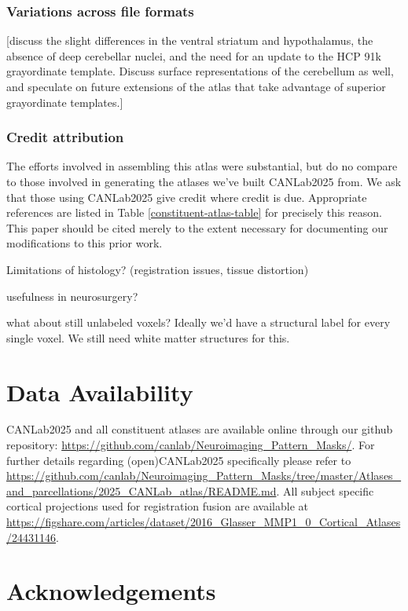 \documentclass[10pt,letterpaper]{article}
\begin{document}
\subsubsection{Variations across file formats}
[discuss the slight differences in the ventral striatum and hypothalamus, the absence of deep cerebellar nuclei, and the need for an update to the HCP 91k grayordinate template. Discuss surface representations of the cerebellum as well, and speculate on future extensions of the atlas that take advantage of superior grayordinate templates.]

\subsubsection{Credit attribution}
The efforts involved in assembling this atlas were substantial, but do no compare to those involved in generating the atlases we've built CANLab2025 from. We ask that those using CANLab2025 give credit where credit is due. Appropriate references are listed in Table \ref{constituent-atlas-table} for precisely this reason. This paper should be cited merely to the extent necessary for documenting our modifications to this prior work.


Limitations of histology? (registration issues, tissue distortion)

usefulness in neurosurgery?

what about still unlabeled voxels? Ideally we'd have a structural label for every single voxel. We still need white matter structures for this.


\section{Data Availability}
CANLab2025 and all constituent atlases are available online through our github repository: \url{https://github.com/canlab/Neuroimaging_Pattern_Masks/}. For further details regarding (open)CANLab2025 specifically please refer to \url{https://github.com/canlab/Neuroimaging_Pattern_Masks/tree/master/Atlases_and_parcellations/2025_CANLab_atlas/README.md}. All subject specific cortical projections used for registration fusion are available at \url{https://figshare.com/articles/dataset/2016_Glasser_MMP1_0_Cortical_Atlases/24431146}. 

\section{Acknowledgements}
\end{document}
